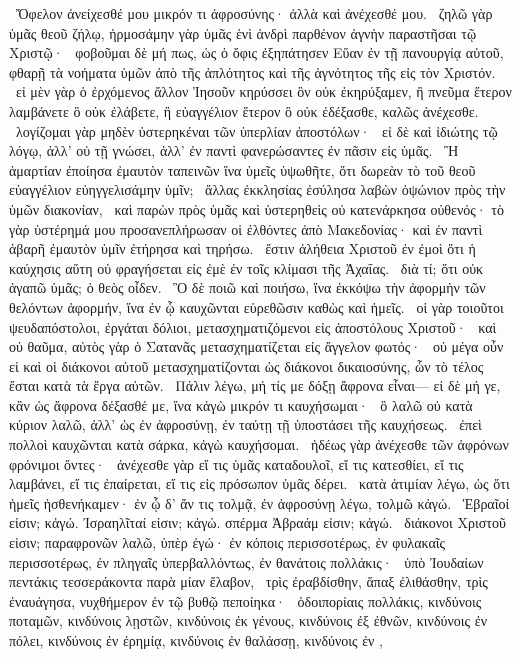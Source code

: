 ~Ὄφελον ἀνείχεσθέ μου μικρόν τι ἀφροσύνης· ἀλλὰ καὶ ἀνέχεσθέ μου.
~ζηλῶ γὰρ ὑμᾶς θεοῦ ζήλῳ, ἡρμοσάμην γὰρ ὑμᾶς ἑνὶ ἀνδρὶ παρθένον ἁγνὴν παραστῆσαι τῷ Χριστῷ·
~φοβοῦμαι δὲ μή πως, ὡς ὁ ὄφις ἐξηπάτησεν Εὕαν ἐν τῇ πανουργίᾳ αὐτοῦ, φθαρῇ τὰ νοήματα ὑμῶν ἀπὸ τῆς ἁπλότητος καὶ τῆς ἁγνότητος τῆς εἰς τὸν Χριστόν.
~εἰ μὲν γὰρ ὁ ἐρχόμενος ἄλλον Ἰησοῦν κηρύσσει ὃν οὐκ ἐκηρύξαμεν, ἢ πνεῦμα ἕτερον λαμβάνετε ὃ οὐκ ἐλάβετε, ἢ εὐαγγέλιον ἕτερον ὃ οὐκ ἐδέξασθε, καλῶς ἀνέχεσθε.
~λογίζομαι γὰρ μηδὲν ὑστερηκέναι τῶν ὑπερλίαν ἀποστόλων·
~εἰ δὲ καὶ ἰδιώτης τῷ λόγῳ, ἀλλ’ οὐ τῇ γνώσει, ἀλλ’ ἐν παντὶ φανερώσαντες ἐν πᾶσιν εἰς ὑμᾶς.
~Ἢ ἁμαρτίαν ἐποίησα ἐμαυτὸν ταπεινῶν ἵνα ὑμεῖς ὑψωθῆτε, ὅτι δωρεὰν τὸ τοῦ θεοῦ εὐαγγέλιον εὐηγγελισάμην ὑμῖν;
~ἄλλας ἐκκλησίας ἐσύλησα λαβὼν ὀψώνιον πρὸς τὴν ὑμῶν διακονίαν,
~καὶ παρὼν πρὸς ὑμᾶς καὶ ὑστερηθεὶς οὐ κατενάρκησα οὐθενός· τὸ γὰρ ὑστέρημά μου προσανεπλήρωσαν οἱ  ἐλθόντες ἀπὸ Μακεδονίας· καὶ ἐν παντὶ ἀβαρῆ ἐμαυτὸν ὑμῖν ἐτήρησα καὶ τηρήσω.
~ἔστιν ἀλήθεια Χριστοῦ ἐν ἐμοὶ ὅτι ἡ καύχησις αὕτη οὐ φραγήσεται εἰς ἐμὲ ἐν τοῖς κλίμασι τῆς Ἀχαΐας.
~διὰ τί; ὅτι οὐκ ἀγαπῶ ὑμᾶς; ὁ θεὸς οἶδεν.
~Ὃ δὲ ποιῶ καὶ ποιήσω, ἵνα ἐκκόψω τὴν ἀφορμὴν τῶν θελόντων ἀφορμήν, ἵνα ἐν ᾧ καυχῶνται εὑρεθῶσιν καθὼς καὶ ἡμεῖς.
~οἱ γὰρ τοιοῦτοι ψευδαπόστολοι, ἐργάται δόλιοι, μετασχηματιζόμενοι εἰς ἀποστόλους Χριστοῦ·
~καὶ οὐ θαῦμα, αὐτὸς γὰρ ὁ Σατανᾶς μετασχηματίζεται εἰς ἄγγελον φωτός·
~οὐ μέγα οὖν εἰ καὶ οἱ διάκονοι αὐτοῦ μετασχηματίζονται ὡς διάκονοι δικαιοσύνης, ὧν τὸ τέλος ἔσται κατὰ τὰ ἔργα αὐτῶν.
~Πάλιν λέγω, μή τίς με δόξῃ ἄφρονα εἶναι— εἰ δὲ μή γε, κἂν ὡς ἄφρονα δέξασθέ με, ἵνα κἀγὼ μικρόν τι καυχήσωμαι·
~ὃ λαλῶ οὐ κατὰ κύριον λαλῶ, ἀλλ’ ὡς ἐν ἀφροσύνῃ, ἐν ταύτῃ τῇ ὑποστάσει τῆς καυχήσεως.
~ἐπεὶ πολλοὶ καυχῶνται κατὰ σάρκα, κἀγὼ καυχήσομαι.
~ἡδέως γὰρ ἀνέχεσθε τῶν ἀφρόνων φρόνιμοι ὄντες·
~ἀνέχεσθε γὰρ εἴ τις ὑμᾶς καταδουλοῖ, εἴ τις κατεσθίει, εἴ τις λαμβάνει, εἴ τις ἐπαίρεται, εἴ τις εἰς πρόσωπον ὑμᾶς δέρει.
~κατὰ ἀτιμίαν λέγω, ὡς ὅτι ἡμεῖς ἠσθενήκαμεν· ἐν ᾧ δ’ ἄν τις τολμᾷ, ἐν ἀφροσύνῃ λέγω, τολμῶ κἀγώ.
~Ἑβραῖοί εἰσιν; κἀγώ. Ἰσραηλῖταί εἰσιν; κἀγώ. σπέρμα Ἀβραάμ εἰσιν; κἀγώ.
~διάκονοι Χριστοῦ εἰσιν; παραφρονῶν λαλῶ, ὑπὲρ ἐγώ· ἐν κόποις περισσοτέρως, ἐν φυλακαῖς περισσοτέρως, ἐν πληγαῖς ὑπερβαλλόντως, ἐν θανάτοις πολλάκις·
~ὑπὸ Ἰουδαίων πεντάκις τεσσεράκοντα παρὰ μίαν ἔλαβον,
~τρὶς ἐραβδίσθην, ἅπαξ ἐλιθάσθην, τρὶς ἐναυάγησα, νυχθήμερον ἐν τῷ βυθῷ πεποίηκα·
~ὁδοιπορίαις πολλάκις, κινδύνοις ποταμῶν, κινδύνοις λῃστῶν, κινδύνοις ἐκ γένους, κινδύνοις ἐξ ἐθνῶν, κινδύνοις ἐν πόλει, κινδύνοις ἐν ἐρημίᾳ, κινδύνοις ἐν θαλάσσῃ, κινδύνοις ἐν ,
